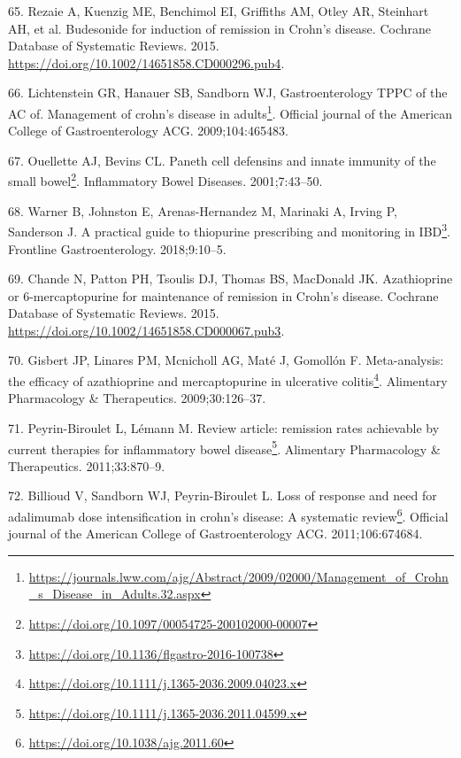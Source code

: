 \documentclass[
  a4paper,
]{book}
\DeclareRobustCommand{\href}[2]{#2\footnote{\url{#1}}}
\newlength{\cslhangindent}
\newlength{\cslentryspacingunit} %
\newenvironment{CSLReferences}[2] %
 {%
  \setlength{\parindent}{0pt}
  \ifodd #1
  \let\oldpar\par
  \def\par{\hangindent=\cslhangindent\oldpar}
  \fi
  \setlength{\parskip}{#2\cslentryspacingunit}
 }%
 {}
\begin{document}
\begin{CSLReferences}{0}{0}
\leavevmode{}%
65. Rezaie A, Kuenzig ME, Benchimol EI, Griffiths AM, Otley AR, Steinhart AH, et al. Budesonide for induction of remission in Crohn's disease. Cochrane Database of Systematic Reviews. 2015. \url{https://doi.org/10.1002/14651858.CD000296.pub4}.

\leavevmode{}%
66. Lichtenstein GR, Hanauer SB, Sandborn WJ, Gastroenterology TPPC of the AC of. \href{https://journals.lww.com/ajg/Abstract/2009/02000/Management_of_Crohn_s_Disease_in_Adults.32.aspx}{Management of crohn's disease in adults}. Official journal of the American College of Gastroenterology \textbar{} ACG. 2009;104:465483.

\leavevmode{}%
67. Ouellette AJ, Bevins CL. \href{https://doi.org/10.1097/00054725-200102000-00007}{Paneth cell defensins and innate immunity of the small bowel}. Inflammatory Bowel Diseases. 2001;7:43--50.

\leavevmode{}%
68. Warner B, Johnston E, Arenas-Hernandez M, Marinaki A, Irving P, Sanderson J. \href{https://doi.org/10.1136/flgastro-2016-100738}{A practical guide to thiopurine prescribing and monitoring in IBD}. Frontline Gastroenterology. 2018;9:10--5.

\leavevmode{}%
69. Chande N, Patton PH, Tsoulis DJ, Thomas BS, MacDonald JK. Azathioprine or 6{-}mercaptopurine for maintenance of remission in Crohn's disease. Cochrane Database of Systematic Reviews. 2015. \url{https://doi.org/10.1002/14651858.CD000067.pub3}.

\leavevmode{}%
70. Gisbert JP, Linares PM, Mcnicholl AG, Maté J, Gomollón F. \href{https://doi.org/10.1111/j.1365-2036.2009.04023.x}{Meta-analysis: the efficacy of azathioprine and mercaptopurine in ulcerative colitis}. Alimentary Pharmacology \& Therapeutics. 2009;30:126--37.

\leavevmode{}%
71. Peyrin-Biroulet L, Lémann M. \href{https://doi.org/10.1111/j.1365-2036.2011.04599.x}{Review article: remission rates achievable by current therapies for inflammatory bowel disease}. Alimentary Pharmacology \& Therapeutics. 2011;33:870--9.

\leavevmode{}%
72. Billioud V, Sandborn WJ, Peyrin-Biroulet L. \href{https://doi.org/10.1038/ajg.2011.60}{Loss of response and need for adalimumab dose intensification in crohn's disease: A systematic review}. Official journal of the American College of Gastroenterology \textbar{} ACG. 2011;106:674684.


\end{CSLReferences}
\end{document}
